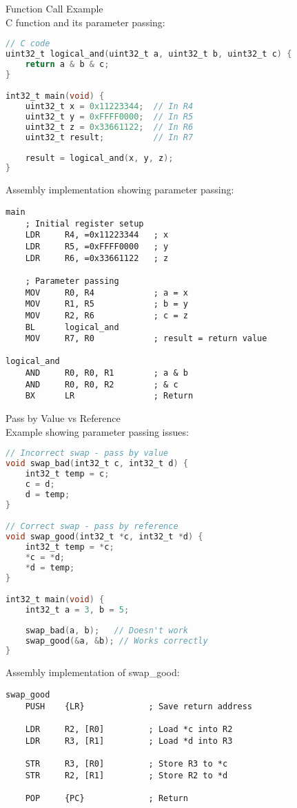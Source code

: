 \begin{example2}{Function Call Example}\\
C function and its parameter passing:

\begin{lstlisting}[language=C, style=basesmol]
// C code
uint32_t logical_and(uint32_t a, uint32_t b, uint32_t c) {
    return a & b & c;
}

int32_t main(void) {
    uint32_t x = 0x11223344;  // In R4
    uint32_t y = 0xFFFF0000;  // In R5
    uint32_t z = 0x33661122;  // In R6
    uint32_t result;          // In R7
    
    result = logical_and(x, y, z);
}
\end{lstlisting}

Assembly implementation showing parameter passing:
\begin{lstlisting}[language=armasm, style=basesmol]
main
    ; Initial register setup
    LDR     R4, =0x11223344   ; x
    LDR     R5, =0xFFFF0000   ; y
    LDR     R6, =0x33661122   ; z
    
    ; Parameter passing
    MOV     R0, R4            ; a = x
    MOV     R1, R5            ; b = y
    MOV     R2, R6            ; c = z
    BL      logical_and       
    MOV     R7, R0            ; result = return value

logical_and
    AND     R0, R0, R1        ; a & b
    AND     R0, R0, R2        ; & c
    BX      LR                ; Return
\end{lstlisting}
\end{example2}

\begin{example2}{Pass by Value vs Reference}\\
Example showing parameter passing issues:

\begin{lstlisting}[language=C, style=basesmol]
// Incorrect swap - pass by value
void swap_bad(int32_t c, int32_t d) {
    int32_t temp = c;
    c = d;
    d = temp;
}

// Correct swap - pass by reference
void swap_good(int32_t *c, int32_t *d) {
    int32_t temp = *c;
    *c = *d;
    *d = temp;
}

int32_t main(void) {
    int32_t a = 3, b = 5;
    
    swap_bad(a, b);   // Doesn't work
    swap_good(&a, &b); // Works correctly
}
\end{lstlisting}

Assembly implementation of swap\_good:
\begin{lstlisting}[language=armasm, style=basesmol]
swap_good
    PUSH    {LR}             ; Save return address
    
    LDR     R2, [R0]         ; Load *c into R2
    LDR     R3, [R1]         ; Load *d into R3
    
    STR     R3, [R0]         ; Store R3 to *c
    STR     R2, [R1]         ; Store R2 to *d
    
    POP     {PC}             ; Return
\end{lstlisting}
\end{example2}

